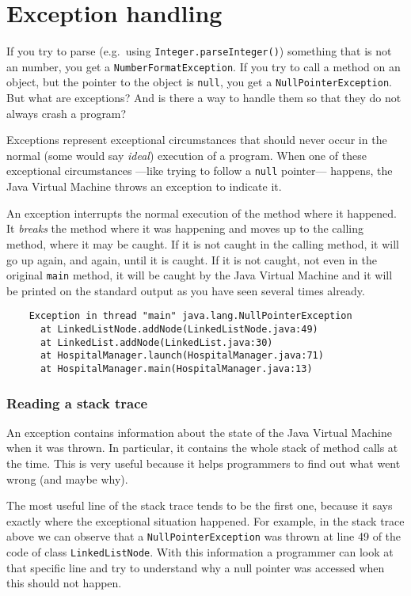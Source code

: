 
\section{Exception handling}
\label{sec:exception-handling}

If you try to parse (e.g.~using \verb+Integer.parseInteger()+) 
something that is not an number, 
you get a \verb+NumberFormatException+. If you try to call a
method on an object, but the pointer to the object is \verb+null+, 
you get a \verb+NullPointerException+. 
But what are exceptions? And is there a
way to handle them so that they do not always crash a program? 

Exceptions represent exceptional circumstances that should never occur
in the normal (some would say \emph{ideal}) execution of a
program. When one of these exceptional circumstances ---like trying to
follow a \verb+null+ pointer--- happens, the Java Virtual Machine
throws an exception to indicate it. 

An exception interrupts the normal execution of the method where it
happened. It \emph{breaks} the method where it was happening and moves up to
the calling method, where it may be caught. If it is not caught in the
calling method, it will go up again, and again, until it is caught. If
it is not caught, not even in the original \verb+main+ method, it will
be caught by the Java Virtual Machine and it will be printed on the
standard output as you have seen several times already. 

\begin{verbatim}
    Exception in thread "main" java.lang.NullPointerException
      at LinkedListNode.addNode(LinkedListNode.java:49)
      at LinkedList.addNode(LinkedList.java:30)
      at HospitalManager.launch(HospitalManager.java:71)
      at HospitalManager.main(HospitalManager.java:13)
\end{verbatim}

\subsubsection*{Reading a stack trace}

An exception contains information about the state of the Java Virtual
Machine when it was thrown. In particular, it contains the whole stack
of method calls at the time. 
This is very useful because it helps programmers to
find out what went wrong (and maybe why). 

The most useful line of the stack trace tends to be the first one,
because it says exactly where the exceptional situation happened. For
example, in the stack trace above we can observe that a
\verb+NullPointerException+ was thrown at line 49 of the code of class 
\verb+LinkedListNode+. With this information a programmer can look at
that specific line and try to understand why a null pointer was
accessed when this should not happen. 

